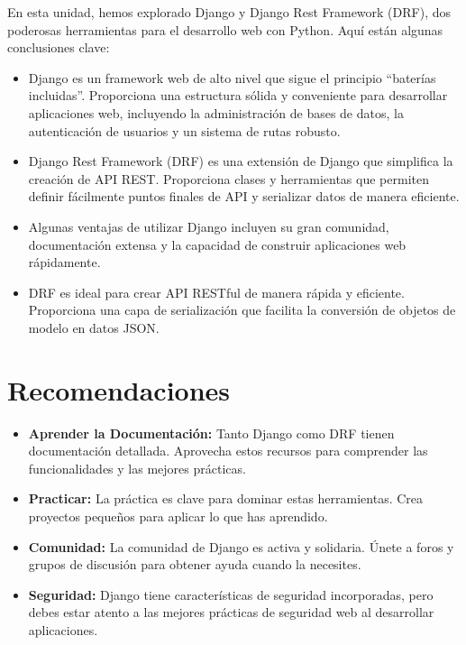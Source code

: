\documentclass[
  a4paper,
  DIV=11,
  numbers=noendperiod,
  onepage,
  openany]{scrreprt}
\begin{document}
En esta unidad, hemos explorado Django y Django Rest Framework (DRF),
dos poderosas herramientas para el desarrollo web con Python. Aquí están
algunas conclusiones clave:

\begin{itemize}
\item
  Django es un framework web de alto nivel que sigue el principio
  ``baterías incluidas''. Proporciona una estructura sólida y
  conveniente para desarrollar aplicaciones web, incluyendo la
  administración de bases de datos, la autenticación de usuarios y un
  sistema de rutas robusto.
\item
  Django Rest Framework (DRF) es una extensión de Django que simplifica
  la creación de API REST. Proporciona clases y herramientas que
  permiten definir fácilmente puntos finales de API y serializar datos
  de manera eficiente.
\item
  Algunas ventajas de utilizar Django incluyen su gran comunidad,
  documentación extensa y la capacidad de construir aplicaciones web
  rápidamente.
\item
  DRF es ideal para crear API RESTful de manera rápida y eficiente.
  Proporciona una capa de serialización que facilita la conversión de
  objetos de modelo en datos JSON.
\end{itemize}

\section{Recomendaciones}\label{recomendaciones}

\begin{itemize}
\item
  \textbf{Aprender la Documentación:} Tanto Django como DRF tienen
  documentación detallada. Aprovecha estos recursos para comprender las
  funcionalidades y las mejores prácticas.
\item
  \textbf{Practicar:} La práctica es clave para dominar estas
  herramientas. Crea proyectos pequeños para aplicar lo que has
  aprendido.
\item
  \textbf{Comunidad:} La comunidad de Django es activa y solidaria.
  Únete a foros y grupos de discusión para obtener ayuda cuando la
  necesites.
\item
  \textbf{Seguridad:} Django tiene características de seguridad
  incorporadas, pero debes estar atento a las mejores prácticas de
  seguridad web al desarrollar aplicaciones.
\end{itemize}
\end{document}
